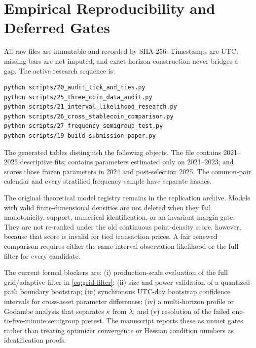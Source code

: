 \section{Empirical Reproducibility and Deferred Gates}
\label{app:empirical}

All raw files are immutable and recorded by SHA-256.  Timestamps are UTC,
missing bars are not imputed, and exact-horizon construction never bridges a
gap.  The active research sequence is:
\begin{verbatim}
python scripts/20_audit_tick_and_ties.py
python scripts/25_three_coin_data_audit.py
python scripts/21_interval_likelihood_research.py
python scripts/26_cross_stablecoin_comparison.py
python scripts/27_frequency_semigroup_test.py
python scripts/19_build_submission_paper.py
\end{verbatim}

The generated tables distinguish the following objects.  The file
 contains 2021--2025 descriptive fits;
 contains parameters estimated only on
2021--2023; and  scores those frozen
parameters in 2024 and post-selection 2025.  The common-pair calendar and
every stratified frequency sample have separate hashes.

The original theoretical model registry remains in the replication archive.
Models with valid finite-dimensional densities are not deleted when they fail
monotonicity, support, numerical identification, or an invariant-margin gate.
They are not re-ranked under the old continuous point-density score, however,
because that score is invalid for tied transaction prices.  A fair renewed
comparison requires either the same interval observation likelihood or the
full filter for every candidate.

The current formal blockers are: (i) production-scale evaluation of the full
grid/adaptive filter in \eqref{eq:grid-filter}; (ii) size and power validation
of a quantized-path boundary bootstrap; (iii) synchronous UTC-day bootstrap
confidence intervals for cross-asset parameter differences; (iv) a
multi-horizon profile or Godambe analysis that separates $\kappa$ from
$\lambda$; and (v) resolution of the failed one-to-five-minute semigroup
pretest.  The manuscript reports these as unmet gates rather than treating
optimizer convergence or Hessian condition numbers as identification proofs.
